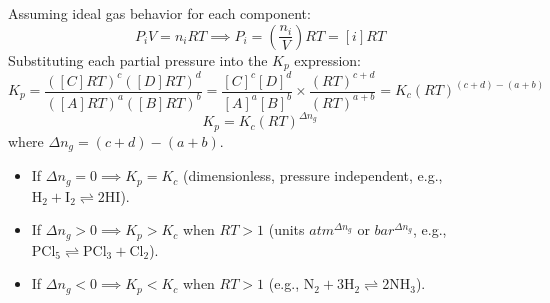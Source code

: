 \documentclass[10pt,a4paper]{article}
\begin{document}
\begin{formulabox}[Derivation of $K_p = K_c(R T)^{\Delta n_g}$]
Assuming ideal gas behavior for each component:
\begin{equation}
  P_i V = n_i R T \implies P_i = \left(\frac{n_i}{V}\right) R T = [i] R T
\end{equation}
Substituting each partial pressure into the $K_p$ expression:
\begin{equation}
  K_p = \frac{([C] R T)^c ([D] R T)^d}{([A] R T)^a ([B] R T)^b} = \frac{[C]^c [D]^d}{[A]^a [B]^b} \times \frac{(R T)^{c+d}}{(R T)^{a+b}} = K_c (R T)^{(c+d) - (a+b)}
\end{equation}
\begin{equation}
  K_p = K_c (R T)^{\Delta n_g}
\end{equation}
where $\Delta n_g = (c + d) - (a + b)$.
\begin{itemize}
  \item If $\Delta n_g = 0 \implies K_p = K_c$ (dimensionless, pressure independent, e.g., $\mathrm{H_2 + I_2 \rightleftharpoons 2HI}$).
  \item If $\Delta n_g > 0 \implies K_p > K_c$ when $R T > 1$ (units $\si{atm^{\Delta n_g}}$ or $\si{bar^{\Delta n_g}}$, e.g., $\mathrm{PCl_5 \rightleftharpoons PCl_3 + Cl_2}$).
  \item If $\Delta n_g < 0 \implies K_p < K_c$ when $R T > 1$ (e.g., $\mathrm{N_2 + 3H_2 \rightleftharpoons 2NH_3}$).
\end{itemize}
\end{formulabox}
\end{document}
